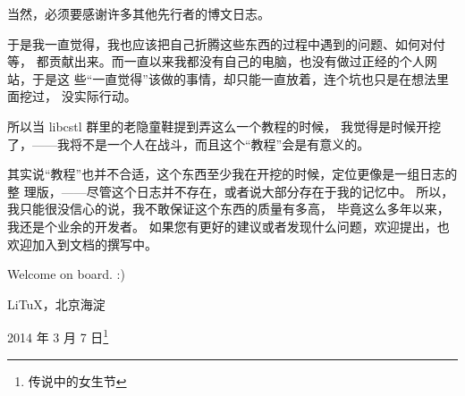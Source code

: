 当然，必须要感谢许多其他先行者的博文日志。

于是我一直觉得，我也应该把自己折腾这些东西的过程中遇到的问题、如何对付等，
都贡献出来。而一直以来我都没有自己的电脑，也没有做过正经的个人网站，于是这
些“一直觉得”该做的事情，却只能一直放着，连个坑也只是在想法里面挖过，
没实际行动。

所以当 libcstl 群里的老隐童鞋提到弄这么一个教程的时候，
我觉得是时候开挖了，——我将不是一个人在战斗，而且这个“教程”会是有意义的。

其实说“教程”也并不合适，这个东西至少我在开挖的时候，定位更像是一组日志的整
理版，——尽管这个日志并不存在，或者说大部分存在于我的记忆中。
所以，我只能很没信心的说，我不敢保证这个东西的质量有多高，
毕竟这么多年以来，我还是个业余的开发者。
如果您有更好的建议或者发现什么问题，欢迎提出，也欢迎加入到文档的撰写中。

Welcome on board. :)

\begin{flushright}
    LiTuX，北京海淀

    2014 年 3 月 7 日\footnote{传说中的女生节}
\end{flushright}
\clearpage{\thispagestyle{empty}\cleardoublepage}

